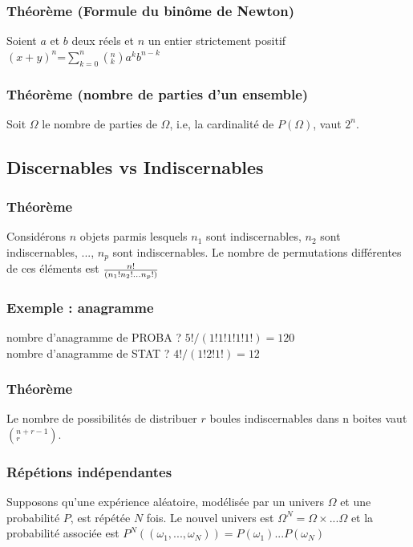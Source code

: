 \documentclass{article}
\begin{document}
            \subsubsection{Théorème (Formule du binôme de Newton)}
                Soient $a$ et $b$ deux réels et $n$ un entier strictement positif\\
                $(x+y)^n$=$\sum_{k=0}^{n}$$(^n_k)$$a^k$$b^{n-k}$
            \subsubsection{Théorème (nombre de parties d'un ensemble)}
                Soit $\Omega$ le nombre de parties de $\Omega$, i.e, la cardinalité de $P(\Omega)$, vaut $2^n$.
                
        \subsection{Discernables vs Indiscernables}
            \subsubsection{Théorème}
                Considérons $n$ objets parmis lesquels $n_1$ sont
                indiscernables, $n_2$ sont indiscernables, ..., $n_p$ sont indiscernables.
                Le nombre de permutations différentes de ces éléments est $n!\over(n_1!n_2!...n_p!)$
            \subsubsection{Exemple : anagramme}
                nombre d'anagramme de PROBA ? $5!/(1!1!1!1!1!) = 120$\\
                nombre d'anagramme de STAT ? $4!/(1!2!1!) = 12$
            \subsubsection{Théorème}
                Le nombre de possibilités de distribuer $r$ boules indiscernables dans n boites vaut $(^{n+r-1}_r)$.
                
            \subsubsection{Répétions indépendantes}
                Supposons qu'une expérience aléatoire, modélisée par un univers $\Omega$ et une probabilité $P$, est 
                répétée $N$ fois. Le nouvel univers est $\Omega^N=\Omega\times...\Omega$ et la probabilité associée
                est $P^N((\omega_1,...,\omega_N))=P(\omega_1)...P(\omega_N)$
                
\end{document}
